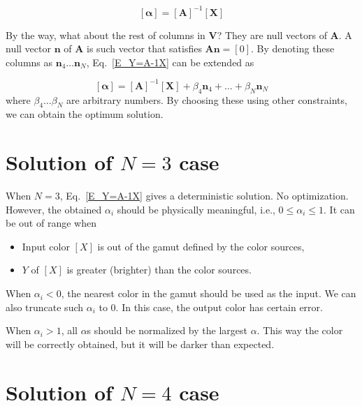 \documentclass[dvipdfmx,uplatex,a4paper]{article}
\begin{document}
\begin{equation}
  \label{E_Y=A-1X}
  \left[ \boldsymbol{\alpha} \right] =
  \left[ \boldsymbol{A} \right]^{-1}
  \left[ \boldsymbol{X} \right]
\end{equation}

By the way, what about the rest of columns in $ \boldsymbol{V} $? They are null vectors of $ \boldsymbol{A} $. A null vector $\boldsymbol{n}$ of $ \boldsymbol{A}$ is such vector that satisfies $ \boldsymbol{A} \boldsymbol{n} = [0]$. By denoting these columns as $ \boldsymbol{n}_4 \ldots \boldsymbol{n}_N $, Eq.~\eqref{E_Y=A-1X} can be extended as

\begin{equation}
  \label{E_Y=A-1X+n}
  \left[ \boldsymbol{\alpha} \right] =
  \left[ \boldsymbol{A} \right]^{-1}
  \left[ \boldsymbol{X} \right]
  + \beta_4 \boldsymbol{n}_4 + \ldots + \beta_N \boldsymbol{n}_N
\end{equation}
\noindent
where $ \beta_4 \ldots \beta_N $ are arbitrary numbers. By choosing these using other constraints, we can obtain the optimum solution.





\section{Solution of $N=3$ case}

When $N=3$, Eq.~\eqref{E_Y=A-1X} gives a deterministic solution. No optimization. However, the obtained $ \alpha_i $ should be physically meaningful, i.e., $ 0 \leq \alpha_i \leq 1 $. It can be out of range when
\begin{itemize}
  \item Input color $[X]$ is out of the gamut defined by the color sources,
  \item $Y$ of $[X]$ is greater (brighter) than the color sources.
\end{itemize}
\noindent
When $ \alpha_i < 0$, the nearest color in the gamut should be used as the input. We can also truncate such $\alpha_i$ to 0. In this case, the output color has certain error.

When $ \alpha_i > 1 $, all $\alpha$s should be normalized by the largest $\alpha$. This way the color will be correctly obtained, but it will be darker than expected.




\section{Solution of $N=4$ case}
\end{document}
